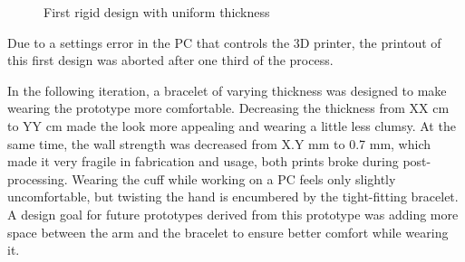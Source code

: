 \begin{figure}[bth]
	\myfloatalign
	 \quad
	\caption{First rigid design with uniform thickness}
\end{figure}

Due to a settings error in the PC that controls the 3D printer, the printout of this first design was aborted after one third of the process.

In the following iteration, a bracelet of varying thickness was designed to make wearing the prototype more comfortable. Decreasing the thickness from XX cm to YY cm made the look more appealing and wearing a little less clumsy. At the same time, the wall strength was decreased from X.Y mm to 0.7 mm, which made it very fragile in fabrication and usage, both prints broke during post-processing. Wearing the cuff while working on a PC feels only slightly uncomfortable, but twisting the hand is encumbered by the tight-fitting bracelet. A design goal for future prototypes derived from this prototype was adding more space between the arm and the bracelet to ensure better comfort while wearing it.

